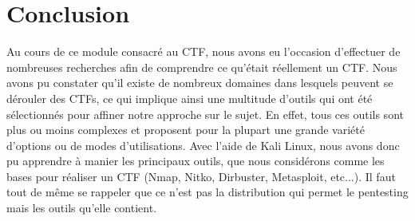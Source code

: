 \chapter{Conclusion}

Au cours de ce module consacré au CTF, nous avons eu l'occasion d'effectuer de nombreuses recherches afin de comprendre ce qu'était réellement un CTF.
Nous avons pu constater qu'il existe de nombreux domaines dans lesquels peuvent se dérouler des CTFs, ce qui implique ainsi une multitude d'outils qui ont été sélectionnés pour affiner notre approche sur le sujet. En effet, tous ces outils sont plus ou moins complexes et proposent pour la plupart une grande variété d'options ou de modes d'utilisations.
Avec l'aide de Kali Linux, nous avons donc pu apprendre à manier les principaux outils, que nous considérons comme les bases pour réaliser un CTF (Nmap, Nitko, Dirbuster, Metasploit, etc...). Il faut tout de même se rappeler que ce n'est pas la distribution qui permet le pentesting mais les outils qu'elle contient.